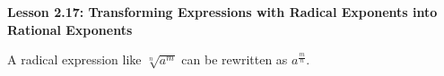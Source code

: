\begin{center}
\textbf{Lesson 2.17: Transforming Expressions with Radical Exponents into Rational Exponents}
\end{center}

\vspace*{1ex}

A radical expression like $\sqrt[{\scriptstyle n}]{a^m}$ can be rewritten as $a^{\tfrac{m}{n}}$.
    
